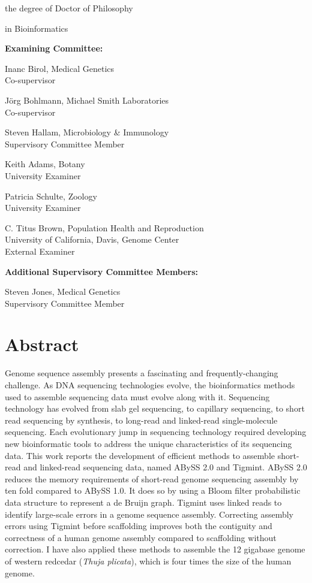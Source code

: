 \documentclass[
  12pt,
  oneside,
  openany]{book}
\begin{document}
the degree of Doctor of Philosophy

in Bioinformatics \vspace{5mm}

\textbf{Examining Committee:}

Inanc Birol, Medical Genetics\\
Co-supervisor

Jörg Bohlmann, Michael Smith Laboratories\\
Co-supervisor

Steven Hallam, Microbiology \& Immunology\\
Supervisory Committee Member

Keith Adams, Botany\\
University Examiner

Patricia Schulte, Zoology\\
University Examiner

C. Titus Brown, Population Health and Reproduction\\
University of California, Davis, Genome Center\\
External Examiner

\vspace{5mm}

\textbf{Additional Supervisory Committee Members:}

Steven Jones, Medical Genetics\\
Supervisory Committee Member

\newpage

\hypertarget{abstract}{%
\section{Abstract}\label{abstract}}

Genome sequence assembly presents a fascinating and frequently-changing challenge. As DNA sequencing technologies evolve, the bioinformatics methods used to assemble sequencing data must evolve along with it. Sequencing technology has evolved from slab gel sequencing, to capillary sequencing, to short read sequencing by synthesis, to long-read and linked-read single-molecule sequencing. Each evolutionary jump in sequencing technology required developing new bioinformatic tools to address the unique characteristics of its sequencing data. This work reports the development of efficient methods to assemble short-read and linked-read sequencing data, named ABySS 2.0 and Tigmint. ABySS 2.0 reduces the memory requirements of short-read genome sequencing assembly by ten fold compared to ABySS 1.0. It does so by using a Bloom filter probabilistic data structure to represent a de Bruijn graph. Tigmint uses linked reads to identify large-scale errors in a genome sequence assembly. Correcting assembly errors using Tigmint before scaffolding improves both the contiguity and correctness of a human genome assembly compared to scaffolding without correction. I have also applied these methods to assemble the 12 gigabase genome of western redcedar (\emph{Thuja plicata}), which is four times the size of the human genome.
\end{document}
